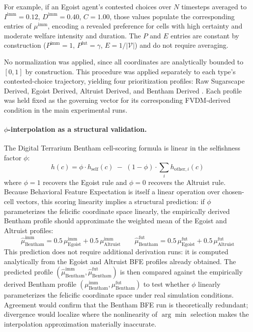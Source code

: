 \documentclass{icsthesis}
\begin{document}
\begin{mainmatter}
For example, if an Egoist agent's contested choices over $N$ timesteps averaged to $I^{\mathrm{imm}} = 0.12$, $D^{\mathrm{imm}} = 0.40$, $C = 1.00$, those values populate the corresponding entries of $\mu^{\mathrm{imm}}$, encoding a revealed preference for cells with high certainty and moderate welfare intensity and duration. The $P$ and $E$ entries are constant by construction ($P^{\mathrm{imm}} = 1$, $P^{\mathrm{fut}} = \gamma$, $E = 1/|\mathcal{V}|$) and do not require averaging.

No normalization was applied, since all coordinates are analytically bounded to $[0,1]$ by construction. This procedure was applied separately to each type's contested-choice trajectory, yielding four prioritization profiles: Raw Sugarscape Derived, Egoist Derived, Altruist Derived, and Bentham Derived \citep{AbbeelNg2004}. Each profile was held fixed as the governing vector for its corresponding FVDM-derived condition in the main experimental runs.

\paragraph{$\phi$-interpolation as a structural validation.}
The Digital Terrarium Bentham cell-scoring formula is linear in the selfishness factor $\phi$:
\[
h(c) = \phi \cdot h_{\mathrm{self}}(c) \;-\; (1 - \phi)\cdot\sum_i h_{\mathrm{other},i}(c)
\]
where $\phi = 1$ recovers the Egoist rule and $\phi = 0$ recovers the Altruist rule. Because Behavioral Feature Expectation is itself a linear operation over chosen-cell vectors, this scoring linearity implies a structural prediction: if $\phi$ parameterizes the felicific coordinate space linearly, the empirically derived Bentham profile should approximate the weighted mean of the Egoist and Altruist profiles:
\[
\hat{\mu}^{\mathrm{imm}}_{\mathrm{Bentham}} = 0.5\,\mu^{\mathrm{imm}}_{\mathrm{Egoist}} + 0.5\,\mu^{\mathrm{imm}}_{\mathrm{Altruist}}
\qquad
\hat{\mu}^{\mathrm{fut}}_{\mathrm{Bentham}} = 0.5\,\mu^{\mathrm{fut}}_{\mathrm{Egoist}} + 0.5\,\mu^{\mathrm{fut}}_{\mathrm{Altruist}}
\]
This prediction does not require additional derivation runs: it is computed analytically from the Egoist and Altruist BFE profiles already obtained. The predicted profile $(\hat{\mu}^{\mathrm{imm}}_{\mathrm{Bentham}},\hat{\mu}^{\mathrm{fut}}_{\mathrm{Bentham}})$ is then compared against the empirically derived Bentham profile $(\mu^{\mathrm{imm}}_{\mathrm{Bentham}},\mu^{\mathrm{fut}}_{\mathrm{Bentham}})$ to test whether $\phi$ linearly parameterizes the felicific coordinate space under real simulation conditions. Agreement would confirm that the Bentham BFE run is theoretically redundant; divergence would localize where the nonlinearity of $\arg\min$ selection makes the interpolation approximation materially inaccurate.


\end{mainmatter}
\end{document}
